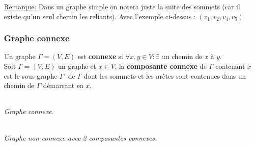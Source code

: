 \documentclass[11pt]{article}
\begin{document}
		\underline{Remarque:} Dans un graphe simple on notera juste la suite des sommets (car il existe qu'un seul chemin les reliants). Avec l'exemple ci-dessus : $(v_1,v_2,v_4,v_5)$

		\subsubsection{Graphe connexe}
            		Un graphe $\Gamma=(V,E)$ est \textbf{connexe} si $\forall x,y \in V : \exists$ un chemin de $x$ à $y$.\\
            		
            		Soit $\Gamma = (V,E)$ un graphe et $x \in V$, la \textbf{composante connexe} de $\Gamma$ contenant $x$ est le sous-graphe $\Gamma'$ de $\Gamma$ dont les sommets et les arêtes sont contenues dans un chemin de $\Gamma$ démarrant en $x$.\\ %
            		
            		\begin{minipage}{0.5\textwidth}
            			\centering
            			 \\
            			\textit{Graphe connexe.}
            			\end{minipage}\hfill
            			\begin{minipage}{0.5\textwidth}
            			\centering
            			 \\
            			\textit{Graphe non-connexe avec 2 composantes connexes.}
            			\end{minipage}
			
\end{document}
